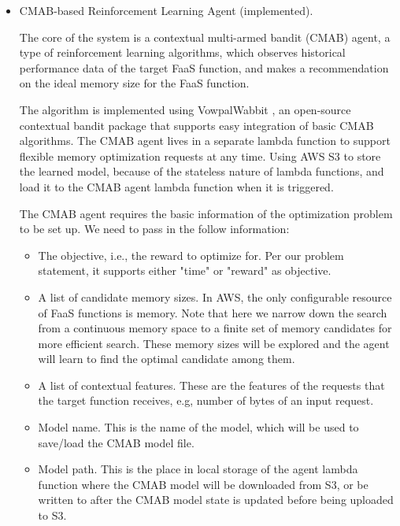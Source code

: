 \documentclass[conference]{IEEEtran}
\begin{document}
\begin{itemize}

\item CMAB-based Reinforcement Learning Agent (implemented).

The core of the system is a contextual multi-armed bandit (CMAB) agent, a type of reinforcement learning algorithms, which observes historical performance data of the target FaaS function, and makes a recommendation on the ideal memory size for the FaaS function.

The algorithm is implemented using VowpalWabbit \cite{vowpal-wabbit}, an open-source contextual bandit package that supports easy integration of basic CMAB algorithms. The CMAB agent lives in a separate lambda function to support flexible memory optimization requests at any time. Using AWS S3 to store the learned model, because of the stateless nature of lambda functions, and load it to the CMAB agent lambda function when it is triggered.

The CMAB agent requires the basic information of the optimization problem to be set up. We need to pass in the follow information: 
\begin{itemize}
    \item The objective, i.e., the reward to optimize for. Per our problem statement, it supports either "time" or "reward" as objective.
    \item A list of candidate memory sizes. In AWS, the only configurable resource of FaaS functions is memory. Note that here we narrow down the search from a continuous memory space to a finite set of memory candidates for more efficient search. These memory sizes will be explored and the agent will learn to find the optimal candidate among them.
    \item A list of contextual features. These are the features of the requests that the target function receives, e.g, number of bytes of an input request.
    \item Model name. This is the name of the model, which will be used to save/load the CMAB model file.
    \item Model path. This is the place in local storage of the agent lambda function where the CMAB model will be downloaded from S3, or be written to after the CMAB model state is updated before being uploaded to S3.
\end{itemize}


\end{itemize}
\end{document}
